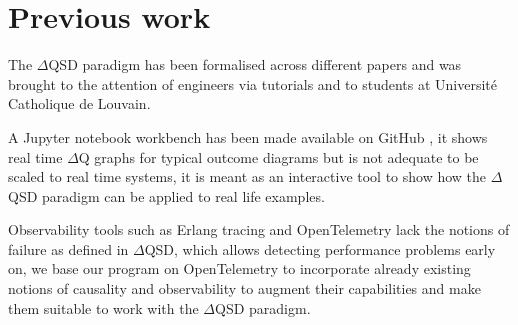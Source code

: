 \section{Previous work}
    The $\Delta$QSD paradigm has been formalised across different papers \cite{art} \cite{myo} and was brought to the attention of engineers via tutorials \cite{dq-tut} and to students at Université Catholique de Louvain. \cite{dq-ucl} 
    
    A Jupyter notebook workbench has been made available on GitHub \cite{dqsd-wkb}, it shows real time $\Delta$Q graphs for typical outcome diagrams but is not adequate to be scaled to real time systems, it is meant as an interactive tool to show how the $\Delta$QSD paradigm can be applied to real life examples.
    
    Observability tools such as Erlang tracing \cite{erl-t} and OpenTelemetry \cite{otel-e} lack the notions of failure as defined in $\Delta$QSD, which allows detecting performance problems early on, we base our program on OpenTelemetry to incorporate already existing notions of causality and observability to augment their capabilities and make them suitable to work with the $\Delta$QSD paradigm.
